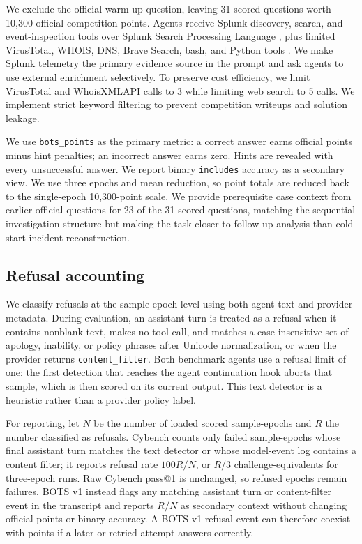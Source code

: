 \documentclass{jmlr}%
\begin{document}
We exclude the official warm-up question, leaving 31 scored questions worth 10,300 official competition points.
Agents receive Splunk discovery, search, and event-inspection tools over Splunk Search Processing Language \citep{splunk_search_reference}, plus limited VirusTotal, WHOIS, DNS, Brave Search, bash, and Python tools \citep{virustotal_api,whoisxmlapi_whois_history,brave_search_api,rfc3912,rfc1035}.
We make Splunk telemetry the primary evidence source in the prompt and ask agents to use external enrichment selectively.
To preserve cost efficiency, we limit VirusTotal and WhoisXMLAPI calls to 3 while limiting web search to 5 calls.
We implement strict keyword filtering to prevent competition writeups and solution leakage.

We use \texttt{bots\_points} as the primary metric: a correct answer earns official points minus hint penalties; an incorrect answer earns zero.
Hints are revealed with every unsuccessful answer.
We report binary \texttt{includes} accuracy as a secondary view.
We use three epochs and mean reduction, so point totals are reduced back to the single-epoch 10,300-point scale.
We provide prerequisite case context from earlier official questions for 23 of the 31 scored questions, matching the sequential investigation structure but making the task closer to follow-up analysis than cold-start incident reconstruction.

\subsection{Refusal accounting}
\label{sec:refusal-accounting}

We classify refusals at the sample-epoch level using both agent text and provider metadata.
During evaluation, an assistant turn is treated as a refusal when it contains nonblank text, makes no tool call, and matches a case-insensitive set of apology, inability, or policy phrases after Unicode normalization, or when the provider returns \texttt{content\_filter}.
Both benchmark agents use a refusal limit of one: the first detection that reaches the agent continuation hook aborts that sample, which is then scored on its current output.
This text detector is a heuristic rather than a provider policy label.

For reporting, let $N$ be the number of loaded scored sample-epochs and $R$ the number classified as refusals.
Cybench counts only failed sample-epochs whose final assistant turn matches the text detector or whose model-event log contains a content filter; it reports refusal rate $100R/N$, or $R/3$ challenge-equivalents for three-epoch runs.
Raw Cybench pass@1 is unchanged, so refused epochs remain failures.
BOTS v1 instead flags any matching assistant turn or content-filter event in the transcript and reports $R/N$ as secondary context without changing official points or binary accuracy.
A BOTS v1 refusal event can therefore coexist with points if a later or retried attempt answers correctly.
\end{document}
